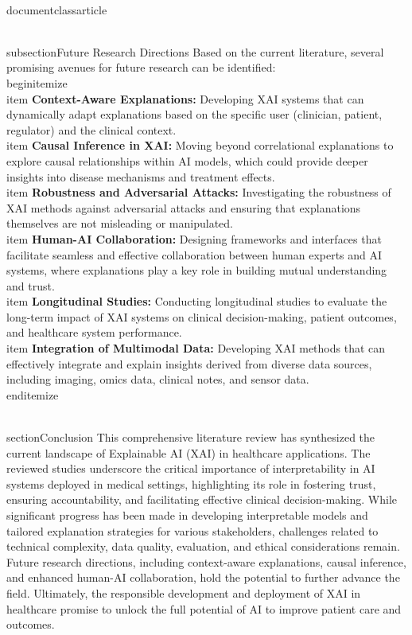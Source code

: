 \\documentclass{article}
\begin{document}
\\subsection{Future Research Directions}
Based on the current literature, several promising avenues for future research can be identified:
\\begin{itemize}
    \\item \textbf{Context-Aware Explanations:} Developing XAI systems that can dynamically adapt explanations based on the specific user (clinician, patient, regulator) and the clinical context.
    \\item \textbf{Causal Inference in XAI:} Moving beyond correlational explanations to explore causal relationships within AI models, which could provide deeper insights into disease mechanisms and treatment effects.
    \\item \textbf{Robustness and Adversarial Attacks:} Investigating the robustness of XAI methods against adversarial attacks and ensuring that explanations themselves are not misleading or manipulated.
    \\item \textbf{Human-AI Collaboration:} Designing frameworks and interfaces that facilitate seamless and effective collaboration between human experts and AI systems, where explanations play a key role in building mutual understanding and trust.
    \\item \textbf{Longitudinal Studies:} Conducting longitudinal studies to evaluate the long-term impact of XAI systems on clinical decision-making, patient outcomes, and healthcare system performance.
    \\item \textbf{Integration of Multimodal Data:} Developing XAI methods that can effectively integrate and explain insights derived from diverse data sources, including imaging, omics data, clinical notes, and sensor data.
\\end{itemize}

\\section{Conclusion}
This comprehensive literature review has synthesized the current landscape of Explainable AI (XAI) in healthcare applications. The reviewed studies underscore the critical importance of interpretability in AI systems deployed in medical settings, highlighting its role in fostering trust, ensuring accountability, and facilitating effective clinical decision-making. While significant progress has been made in developing interpretable models and tailored explanation strategies for various stakeholders, challenges related to technical complexity, data quality, evaluation, and ethical considerations remain. Future research directions, including context-aware explanations, causal inference, and enhanced human-AI collaboration, hold the potential to further advance the field. Ultimately, the responsible development and deployment of XAI in healthcare promise to unlock the full potential of AI to improve patient care and outcomes.

\
\ %

\
\end{document}
